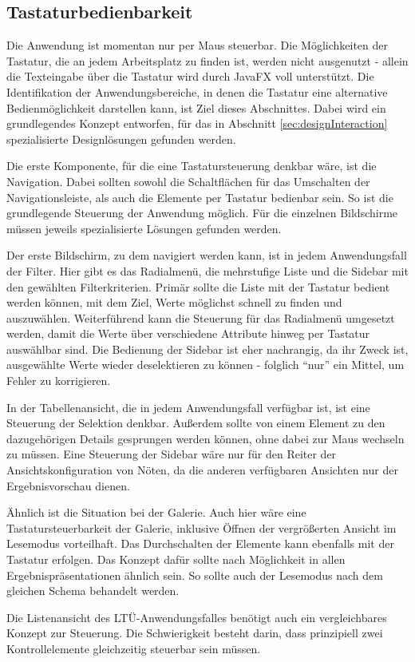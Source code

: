 \subsection{Tastaturbedienbarkeit}
Die Anwendung ist momentan nur per Maus steuerbar. Die Möglichkeiten der Tastatur, die an jedem Arbeitsplatz zu finden ist, werden nicht ausgenutzt - allein die Texteingabe über die Tastatur wird durch JavaFX voll unterstützt. Die Identifikation der Anwendungsbereiche, in denen die Tastatur eine alternative Bedienmöglichkeit darstellen kann, ist Ziel dieses Abschnittes. Dabei wird ein grundlegendes Konzept entworfen, für das in Abschnitt \ref{sec:designInteraction} spezialisierte Designlösungen gefunden werden.\par
Die erste Komponente, für die eine Tastatursteuerung denkbar wäre, ist die Navigation. Dabei sollten sowohl die Schaltflächen für das Umschalten der Navigationsleiste, als auch die Elemente per Tastatur bedienbar sein. So ist die grundlegende Steuerung der Anwendung möglich. Für die einzelnen Bildschirme müssen jeweils spezialisierte Lösungen gefunden werden.\par
Der erste Bildschirm, zu dem navigiert werden kann, ist in jedem Anwendungsfall der Filter. Hier gibt es das Radialmenü, die mehrstufige Liste und die Sidebar mit den gewählten Filterkriterien. Primär sollte die Liste mit der Tastatur bedient werden können, mit dem Ziel, Werte möglichst schnell zu finden und auszuwählen. Weiterführend kann die Steuerung für das Radialmenü umgesetzt werden, damit die Werte über verschiedene Attribute hinweg per Tastatur auswählbar sind. Die Bedienung der Sidebar ist eher nachrangig, da ihr Zweck ist, ausgewählte Werte wieder deselektieren zu können - folglich \enquote{nur} ein Mittel, um Fehler zu korrigieren.\par
In der Tabellenansicht, die in jedem Anwendungsfall verfügbar ist, ist eine Steuerung der Selektion denkbar. Außerdem sollte von einem Element zu den dazugehörigen Details gesprungen werden können, ohne dabei zur Maus wechseln zu müssen. Eine Steuerung der Sidebar wäre nur für den Reiter der Ansichtskonfiguration von Nöten, da die anderen verfügbaren Ansichten nur der Ergebnisvorschau dienen.\par
Ähnlich ist die Situation bei der Galerie. Auch hier wäre eine Tastatursteuerbarkeit der Galerie, inklusive Öffnen der vergrößerten Ansicht im Lesemodus vorteilhaft. Das Durchschalten der Elemente kann ebenfalls mit der Tastatur erfolgen. Das Konzept dafür sollte nach Möglichkeit in allen Ergebnispräsentationen ähnlich sein. So sollte auch der Lesemodus nach dem gleichen Schema behandelt werden.\par
Die Listenansicht des LTÜ-Anwendungsfalles benötigt auch ein vergleichbares Konzept zur Steuerung. Die Schwierigkeit besteht darin, dass prinzipiell zwei Kontrollelemente gleichzeitig steuerbar sein müssen.\par
